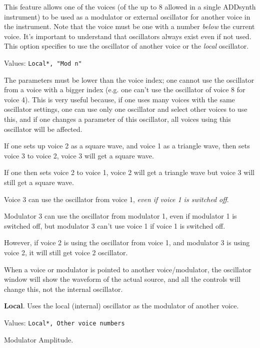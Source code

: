    This feature allows one of the voices (of the up to 8 allowed in a single
   ADDsynth instrument) to be used as a modulator or external oscillator for
   another voice in the instrument.
   Note that the voice must be one with a number \textsl{below} the current
   voice.
   It's important to understand that oscillators always exist even if not
   used.
   This option specifies to use the oscillator of another voice or
   the \textsl{local} oscillator.

   Values: \texttt{Local*, "Mod n"}

   The parameters must be lower than the voice index; one cannot use the
   oscillator from a voice with a bigger index (e.g. one can't use the
   oscillator of voice 8 for voice 4). This is very useful because, if
   one uses many voices with the same oscillator settings, one can use only
   one oscillator and select other voices to use this, and if one changes a
   parameter of this oscillator, all voices using this oscillator will be
   affected.

   If one sets up voice 2 as a square wave, and voice 1 as a triangle wave,
   then sets voice 3 to voice 2, voice 3 will get a square wave.

   If one then sets voice 2 to voice 1, voice 2 will get a triangle wave but
   voice 3 will still get a square wave.

   Voice 3 can use the oscillator from voice 1,
   \textsl{even if voice 1 is switched off}.

   Modulator 3 can use the oscillator from modulator 1, even if modulator 1 is
   switched off, but modulator 3 can't use voice 1 if voice 1 is
   switched off.

   However, if voice 2 is using the oscillator from voice 1, and modulator 3 is
   using voice 2, it will still get voice 2 oscillator.

   When a voice or modulator is pointed to another voice/modulator, the
   oscillator window will show the waveform of the actual source, and all the
   controls will change this, not the internal oscillator.

   \textbf{Local}.
   Uses the local (internal) oscillator as the modulator of another voice.

   Values: \texttt{Local*, Other voice numbers}

   Modulator Amplitude.

